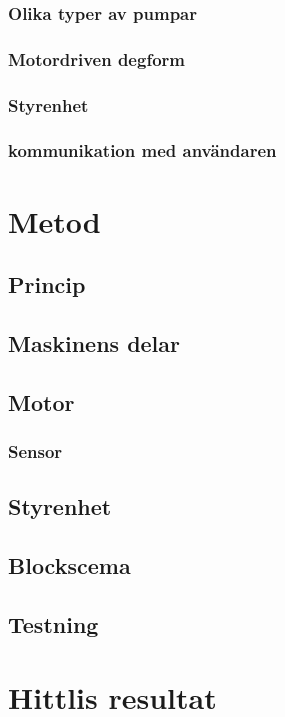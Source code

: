 \documentclass[11pt,a4paper,oneside]{book}
\begin{document}
\subsection{Olika typer av pumpar}
 
\newpage
\subsection{Motordriven degform}

\subsection{Styrenhet}

\subsection{kommunikation med användaren}


\chapter{Metod}
\section{Princip}
\section{Maskinens delar}
\section{Motor}
\subsection{Sensor}
\section{Styrenhet}

\section{Blockscema}
\section{Testning}

\chapter{Hittlis resultat}
\end{document}
